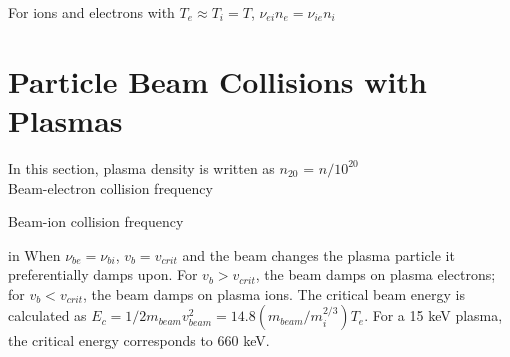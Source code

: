 \indent For ions and electrons with $T_{e}\approx T_{i}=T$, $\nu_{ei}n_{e}=\nu_{ie}n_{i}$ \\


\section{Particle Beam Collisions with Plasmas}
In this section, plasma density is written as $n_{20}$ = $n/10^{20}$\\

\noindent
Beam-electron collision frequency 

\noindent
Beam-ion collision frequency 

 in When $\nu_{be} = \nu_{bi}$, $v_b = v_{crit}$ and
the beam changes the plasma particle it preferentially damps upon.
For $v_b > v_{crit}$, the beam damps on plasma electrons; for $v_b <
v_{crit}$, the beam damps on plasma ions.  The critical beam energy is
calculated as $E_{c}=1/2m_{beam} v_{beam}^2=14.8
(m_{beam}/m_{i}^{2/3})T_{e}$. For a 15 keV plasma, the critical energy
  corresponds to 660 keV.\\


